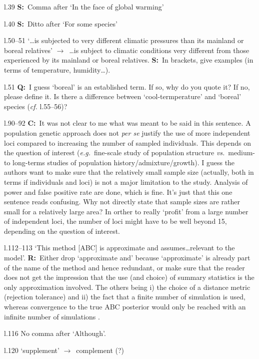 \documentclass[11pt]{article}
\newenvironment{my_description}
{\begin{description}
  \setlength{\itemsep}{2pt}
  \setlength{\parskip}{0pt}
  \setlength{\parsep}{0pt}}
{\end{description}}
\newcommand{\ra}{$\rightarrow$\ }
\newcommand{\C}{\textbf{C:}\ }
\newcommand{\Q}{\textbf{Q:}\ }
\newcommand{\R}{\textbf{R:}\ }
\newcommand{\V}{\textbf{S:}\ }
\begin{document}
\begin{my_description}
	\item[l.39] \V Comma after `In the face of global warming'
	\item[l.40] \V Ditto after `For some species'
	\item[l.50--51] `\dots is subjected to very different climatic pressures than its mainland or boreal relatives' \ra \dots is subject to climatic conditions very different from those experienced by its mainland or boreal relatives. \V In brackets, give examples (in terms of temperature, humidity\dots).
	\item[l.51] \Q I guess `boreal' is an established term. If so, why do you quote it? If no, please define it. Is there a difference between `cool-termperature' and `boreal' species (\emph{cf.} l.55--56)?
	\item[l.90--92] \C It was not clear to me what was meant to be said in this sentence. A population genetic approach does not \emph{per se} justify the use of more independent loci compared to increasing the number of sampled individuals. This depends on the question of interest (\emph{e.g.}\ fine-scale study of population structure \emph{vs.}\ medium- to long-terms studies of population history/admixture/growth). I guess the authors want to make sure that the relatively small sample size (actually, both in terms if individuals and loci) is not a major limitation to the study. Analysis of power and false positive rate are done, which is fine. It's just that this one sentence reads confusing. Why not directly state that sample sizes are rather small for a relatively large area? In orther to really `profit' from a large number of independent loci, the number of loci might have to be well beyond 15, depending on the question of interest.
	\item[l.112--113] `This method [ABC] is approximate and assumes\dots relevant to the model'. \R Either drop `approximate and' because `approximate' is already part of the name of the method and hence redundant, or make sure that the reader does not get the impression that the use (and choice) of summary statistics is the only approximation involved. The others being i) the choice of a distance metric (rejection tolerance) and ii) the fact that a finite number of simulation is used, whereas convergence to the true ABC posterior would only be reached with an infinite number of simulations \citep[see one of the recent ABC reviews, \emph{e.g.}][]{Beaumont:2010uq}.
	\item[l.116] No comma after `Although'.
	\item[l.120] `supplement' \ra complement (?)

\end{my_description}
\end{document}
